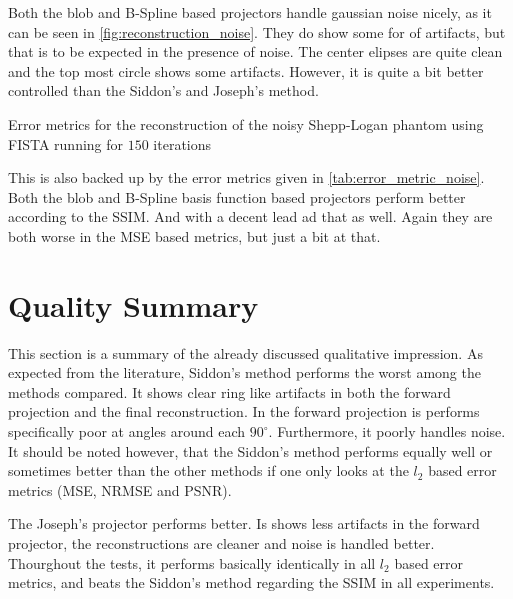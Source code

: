 Both the blob and B-Spline based projectors handle gaussian noise nicely, as it can be seen in
\autoref{fig:reconstruction_noise}. They do show some for of artifacts, but that is to be expected
in the presence of noise. The center elipses are quite clean and the top most circle shows some
artifacts. However, it is quite a bit better controlled than the Siddon's and Joseph's method.

\begin{table}[h]%
	\centering
	\caption{Error metrics for the reconstruction of the noisy Shepp-Logan phantom using FISTA
		running for \(150\) iterations}%
	\label{tab:error_metric_noise}
\end{table}

This is also backed up by the error metrics given in \autoref{tab:error_metric_noise}. Both the
blob and B-Spline basis function based projectors perform better according to the \gls{SSIM}. And
with a decent lead ad that as well. Again they are both worse in the \gls{MSE} based metrics, but
just a bit at that.

\section{Quality Summary}\label{sec:experiments_quality_projection}

This section is a summary of the already discussed qualitative impression. As expected from the
literature, Siddon's method performs the worst among the methods compared. It shows clear ring like
artifacts in both the forward projection and the final reconstruction. In the forward projection is
performs specifically poor at angles around each \(90^\circ\). Furthermore, it poorly handles noise.
It should be noted however, that the Siddon's method performs equally well or sometimes better than
the other methods if one only looks at the \(l_2\) based error metrics (\gls{MSE}, \gls{NRMSE} and
\gls{PSNR}).

The Joseph's projector performs better. Is shows less artifacts in the forward projector, the
reconstructions are cleaner and noise is handled better. Thourghout the tests, it performs basically
identically in all \(l_2\) based error metrics, and beats the Siddon's method regarding the
\gls{SSIM} in all experiments.

